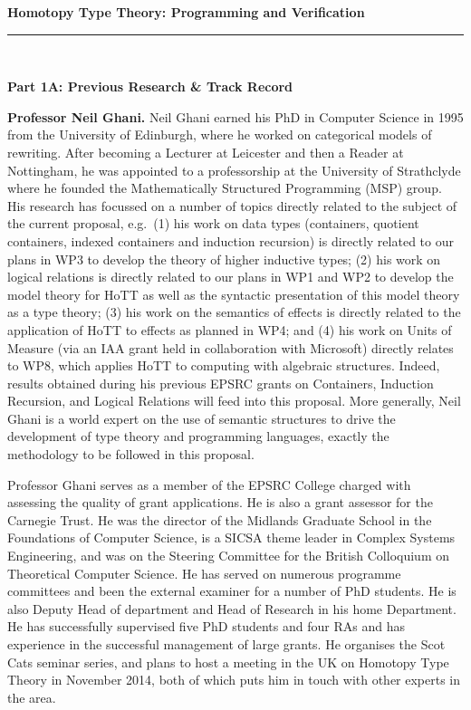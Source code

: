 \documentclass[a4paper,11pt]{article}
\newcommand{\eg}{{e.g.}\ }
\begin{document}
\thispagestyle{plain}
\begin{center}
  {\Large {\bf Homotopy Type Theory: Programming and Verification}}\\[1ex] 

\vspace*{-0.1in}

  \rule{140mm}{.5mm}\\[2ex]
\end{center}

\noindent
{\bf \Large Part 1A: Previous Research \& Track Record}

\textbf{Professor Neil Ghani.} Neil Ghani earned his PhD in Computer
Science in 1995 from the University of Edinburgh, where he worked on
categorical models of rewriting.  After becoming a Lecturer at
Leicester and then a Reader at Nottingham, he was appointed to a
professorship at the University of Strathclyde where he founded the
Mathematically Structured Programming (MSP) group. His research has
focussed on a number of topics directly related to the subject of the
current proposal, \eg (1) his work on data types (containers, quotient
containers, indexed containers and induction recursion) is directly
related to our plans in WP3 to develop the theory of higher inductive
types; (2) his work on logical relations is directly related to our
plans in WP1 and WP2 to develop the model theory for HoTT as well as
the syntactic presentation of this model theory as a type theory; (3)
his work on the semantics of effects is directly related to the
application of HoTT to effects as planned in WP4; and (4) his work on
Units of Measure (via an IAA grant held in collaboration with
Microsoft) directly relates to WP8, which applies HoTT to computing
with algebraic structures. Indeed, results obtained during
his previous EPSRC grants on Containers, Induction Recursion,
and Logical Relations will feed into this proposal.
More generally, Neil Ghani is a world expert on the use of
semantic structures to drive the development of type theory and
programming languages, exactly the methodology to be followed in this
proposal.

Professor Ghani serves as a member of the EPSRC College charged with
assessing the quality of grant applications. He is also a grant
assessor for the Carnegie Trust.  He was the director of the Midlands
Graduate School in the Foundations of Computer Science, is a SICSA
theme leader in Complex Systems Engineering, and was on the Steering
Committee for the British Colloquium on Theoretical Computer Science.
He has served on numerous programme committees and been the external
examiner for a number of PhD students. He is also Deputy Head of
department and Head of Research in his home Department. He has
successfully supervised five PhD students and four RAs and has
experience in the successful management of large grants. He organises
the Scot Cats seminar series, and plans to host a meeting in the UK on
Homotopy Type Theory in November 2014, both of which puts him in touch
with other experts in the area.
\end{document}

